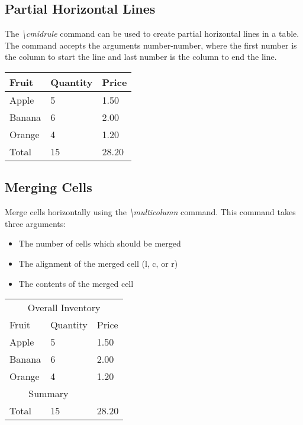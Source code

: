 \documentclass{article}
\newcommand{\cmd}[1]{\textit{#1}}
\begin{document}
\subsection{Partial Horizontal Lines}

The \cmd{\textbackslash cmidrule} command can be used to create partial horizontal lines in a
table. The command accepts the arguments {number-number}, where the first number is the column to
start the line and last number is the column to end the line.

\begin{tabular}{*{3}{l}}
  \toprule
  Fruit  & Quantity &  Price \\
  \midrule
  Apple  & 5        &  1.50  \\
  Banana & 6        &  2.00  \\
  Orange & 4        &  1.20  \\
  \cmidrule{3-3}
  Total & 15        & 28.20  \\
  \bottomrule
\end{tabular}

\subsection{Merging Cells}

Merge cells horizontally using the \cmd{\textbackslash multicolumn} command. This command takes
three arguments:

\begin{itemize}
  \item The number of cells which should be merged
  \item The alignment of the merged cell (l, c, or r)
  \item The contents of the merged cell
\end{itemize}

\begin{tabular}{*{3}{l}}
  \toprule
  \multicolumn{3}{c}{Overall Inventory} \\
  Fruit  & Quantity &  Price  \\
  \midrule
  Apple  & 5        &  1.50   \\
  Banana & 6        &  2.00   \\
  Orange & 4        &  1.20   \\
  \midrule
  \multicolumn{2}{c}{Summary} \\
  Total & 15        & 28.20   \\
  \bottomrule
\end{tabular}
\end{document}
